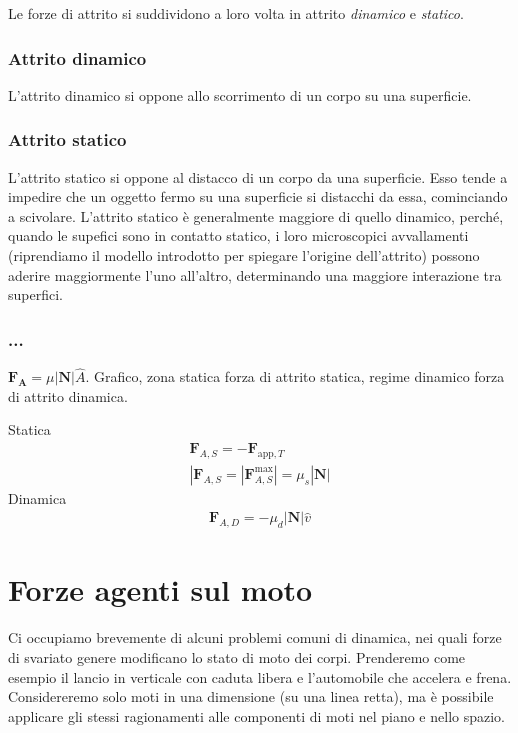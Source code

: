 Le forze di attrito si suddividono a loro volta in attrito \textit{dinamico} e
\textit{statico}.

\subsubsection*{Attrito dinamico}
L'attrito dinamico si oppone allo scorrimento di un corpo su una superficie.

\subsubsection*{Attrito statico}
L'attrito statico si oppone al distacco di un corpo da una superficie. Esso tende
a impedire che un oggetto fermo su una superficie si distacchi da essa, cominciando
a scivolare. L'attrito statico è generalmente maggiore di quello dinamico, perché,
quando le supefici sono in contatto statico, i loro microscopici avvallamenti
(riprendiamo il modello introdotto per spiegare l'origine dell'attrito)
possono aderire maggiormente l'uno all'altro, determinando una maggiore
interazione tra superfici.

\subsubsection*{...}
$\mathbf{F_A} = \mu|\mathbf{N}|\hat{A}$. Grafico, zona statica
forza di attrito statica, regime dinamico forza di attrito dinamica.

Statica
\begin{align}
    \mathbf{F}_{A,S} = -\mathbf{F}_{\text{app}, T}\\
    |\mathbf{F}_{A,S} = |\mathbf{F}_{A,S}^\text{max}| = \mu_s|\mathbf{N}|
\end{align}
Dinamica
\begin{align}
    \mathbf{F}_{A,D} = -\mu_d|\mathbf{N}|\hat{v}
\end{align}



\section{Forze agenti sul moto}
Ci occupiamo brevemente di alcuni problemi comuni di dinamica, nei
quali forze di svariato genere modificano lo stato di moto dei corpi.
Prenderemo come esempio il lancio in verticale con caduta libera e
l'automobile che accelera e frena. Considereremo solo moti in una
dimensione (su una linea retta), ma è possibile applicare gli stessi
ragionamenti alle componenti di moti nel piano e nello spazio.

